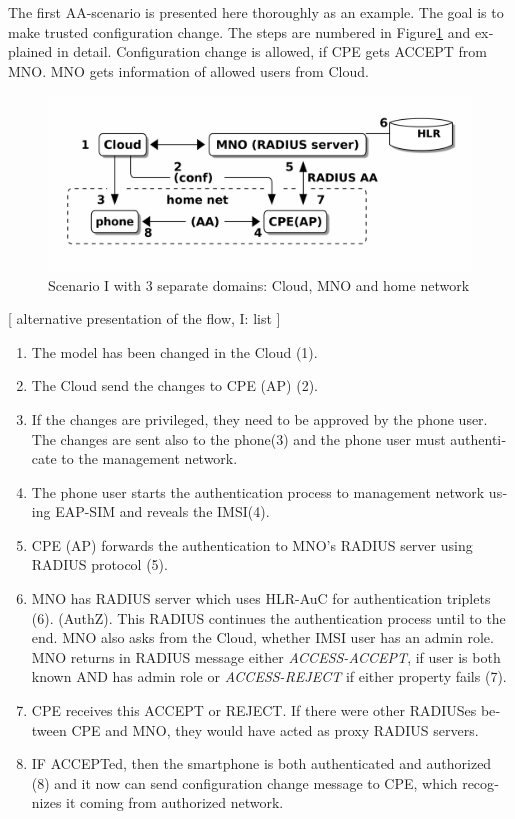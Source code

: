 \documentclass[12pt,a4paper,english]{tutthesis}
\begin{document}
\begin{otherlanguage}{english}
\label{scenario-i}
The first AA-scenario is presented here thoroughly as an example.
The goal is to make trusted configuration change. 
The steps are numbered  in Figure\ref{fig:scenario-I} and explained in detail.
Configuration change is allowed, if CPE gets ACCEPT from MNO.  MNO gets
information of allowed users from Cloud.


\begin{figure}[htb]
\centering
\includegraphics[width=.9\linewidth]{scenI.png}
\caption{\label{fig:scenario-I}Scenario I with 3 separate domains: Cloud, MNO and home network}
\end{figure}



[ alternative presentation of the flow, I: list ] 

\begin{enumerate}
\item The model has been changed in the Cloud (1).
\item The Cloud send the changes to CPE (AP) (2).
\item If the changes are privileged, they need to be approved by the phone user.
The changes are sent also to the phone(3) and the phone user must
authenticate to the management network.
\item The phone user starts the authentication process to management
network using EAP-SIM and reveals the IMSI(4).
\item CPE (AP) forwards the authentication to MNO's RADIUS server using
RADIUS protocol (5).
\item MNO has RADIUS server which uses HLR-AuC for authentication
  triplets (6). 
  (AuthZ). This RADIUS continues the authentication process until to
  the end. 
MNO also asks from the Cloud, whether IMSI user has an admin role.
MNO returns in RADIUS message either \emph{ACCESS-ACCEPT}, if user is both
  known AND has admin role  or \emph{ACCESS-REJECT} if either property
  fails (7).
\item CPE receives this ACCEPT or REJECT. If there were other RADIUSes
between CPE and MNO, they would have acted
as proxy RADIUS servers.
\item IF ACCEPTed, then the smartphone is both authenticated and
authorized (8) and it now 
can send configuration change message to CPE, which recognizes it
coming from authorized  network.
\end{enumerate}




\end{otherlanguage}
\end{document}
